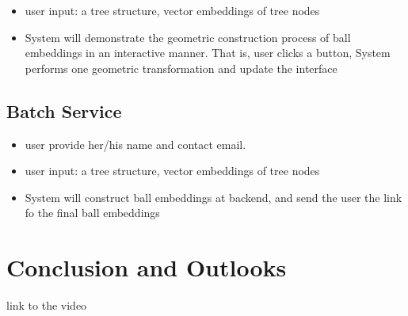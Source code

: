 \documentclass[runningheads]{llncs}
\begin{document}
\begin{itemize}
	\item user input: a tree structure, vector embeddings of tree nodes
	\item System will demonstrate the geometric construction process of ball embeddings in an interactive manner. That is, user clicks a button, System performs one geometric transformation and update the interface 
\end{itemize}

\subsection{Batch Service}

\begin{itemize}
	\item user provide her/his name and contact email.
	\item user input: a tree structure, vector embeddings of tree nodes
	\item System will construct ball embeddings at backend, and send the user the link fo the final ball embeddings  
\end{itemize}

\section{Conclusion and Outlooks}

link to the video

 
%
%
%
% 
% 


 
\end{document}
